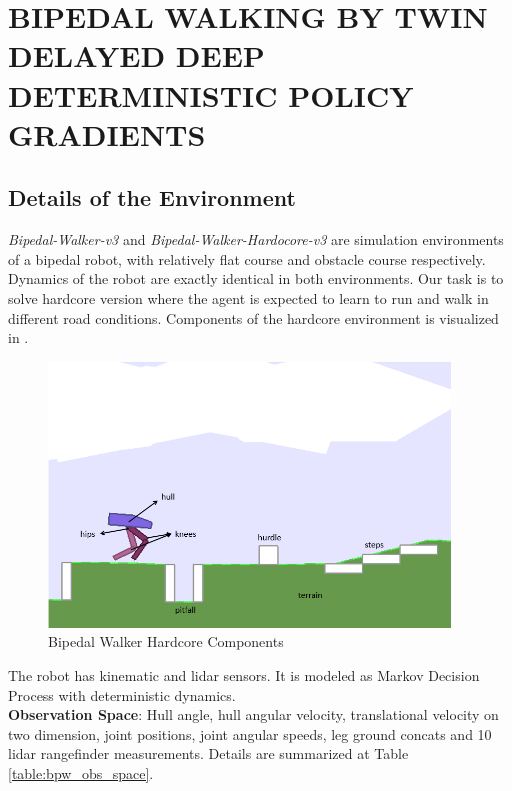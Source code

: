 \chapter{BIPEDAL WALKING BY TWIN DELAYED DEEP DETERMINISTIC POLICY GRADIENTS}
\label{chap:exp_setup}

\section{Details of the Environment}
\textit{Bipedal-Walker-v3} and \textit{Bipedal-Walker-Hardocore-v3} are simulation environments of a bipedal robot, with relatively flat course and obstacle course respectively. Dynamics of the robot are exactly identical in both environments. Our task is to solve hardcore version where the agent is expected to learn to run and walk in different road conditions. Components of the hardcore environment is visualized in . \\
\begin{figure}
	\centering
	\includegraphics[width=0.95\textwidth]{figures/bipedal/bpedal_annotated.png}
	\caption{Bipedal Walker Hardcore Components}
	\label{fig:bipedal_hardcore_components}
\end{figure}
The robot has kinematic and lidar sensors. It is modeled as Markov Decision Process with deterministic dynamics. \\
\textbf{Observation Space}: Hull angle, hull angular velocity, translational velocity on two dimension, joint positions, joint angular speeds, leg ground concats and 10 lidar rangefinder measurements. Details are summarized at Table \ref{table:bpw_obs_space}. \\
